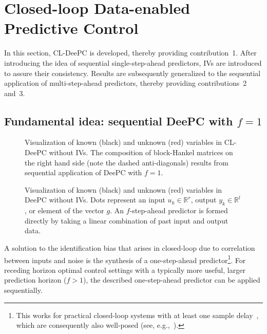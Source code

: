 \section{Closed-loop Data-enabled Predictive Control}\label{sec:CL-DeePC}
\noindent In this section, \ac{CL-DeePC} is developed, thereby providing contribution~1. After introducing the idea of sequential single-step-ahead predictors, \ac{IVs} are introduced to assure their consistency. Results are subsequently generalized to the sequential application of multi-step-ahead predictors, thereby providing contributions~2 and~3.

\subsection{Fundamental idea: sequential \ac{DeePC} with $f=1$}
\begin{figure}[b!]
\centering

\caption{Visualization of known (black) and unknown (red) variables in \ac{CL-DeePC} without \ac{IVs}. The composition of block-Hankel matrices on the right hand side (note the dashed anti-diagonals) results from sequential application of \ac{DeePC} with $f=1$.}
\label{fig:CL-DeePC}
\end{figure}
\begin{figure}[b!]
\centering

\caption{Visualization of known (black) and unknown (red) variables in \ac{DeePC} without \ac{IVs}. Dots represent an input $u_k\in\mathbb{R}^r$, output $y_k\in\mathbb{R}^l$, or element of the vector $g$. An $f$-step-ahead predictor is formed directly by taking a linear combination of past input and output data.}%
\label{fig:regular-DeePC}
\end{figure}
\noindent A solution to the identification bias that arises in closed-loop due to correlation between inputs and noise %
is the synthesis of a one-step-ahead predictor\footnote{This works for practical closed-loop systems with at least one sample delay~\citep{Ljung1996}, which are consequently also well-posed (see, e.g.,~\citet{vanderVeen2013}).}. For receding horizon optimal control settings with a typically more useful, larger prediction horizon ($f>1$), the described one-step-ahead predictor can be applied sequentially.

